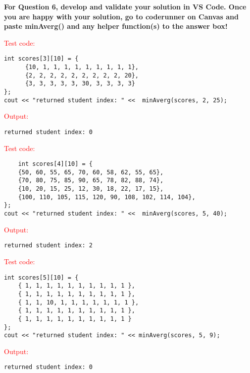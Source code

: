 \textbf{For Question 6, develop and validate your solution in VS Code. Once you are happy with your solution, go to coderunner on Canvas and paste minAverg() and any helper function(s) to the answer box!} 

\begin{sample}
\textcolor{red}{Test code:}
\begin{verbatim}
int scores[3][10] = {
      {10, 1, 1, 1, 1, 1, 1, 1, 1, 1},
      {2, 2, 2, 2, 2, 2, 2, 2, 2, 20},  
      {3, 3, 3, 3, 3, 30, 3, 3, 3, 3}
};
cout << "returned student index: " <<  minAverg(scores, 2, 25);
\end{verbatim}
\textcolor{red}{Output:}
\begin{verbatim}
returned student index: 0
\end{verbatim}
\end{sample}

\begin{sample}
\textcolor{red}{Test code:}
\begin{verbatim}
    int scores[4][10] = {
    {50, 60, 55, 65, 70, 60, 58, 62, 55, 65}, 
    {70, 80, 75, 85, 90, 65, 78, 82, 88, 74},
    {10, 20, 15, 25, 12, 30, 18, 22, 17, 15},  
    {100, 110, 105, 115, 120, 90, 108, 102, 114, 104},
};
cout << "returned student index: " <<  minAverg(scores, 5, 40);
\end{verbatim}
\textcolor{red}{Output:}
\begin{verbatim}
returned student index: 2
\end{verbatim}
\end{sample}

\begin{sample}
\textcolor{red}{Test code:}
\begin{verbatim}
int scores[5][10] = { 
    { 1, 1, 1, 1, 1, 1, 1, 1, 1, 1 },
    { 1, 1, 1, 1, 1, 1, 1, 1, 1, 1 },
    { 1, 1, 10, 1, 1, 1, 1, 1, 1, 1 },
    { 1, 1, 1, 1, 1, 1, 1, 1, 1, 1 },
    { 1, 1, 1, 1, 1, 1, 1, 1, 1, 1 }
};
cout << "returned student index: " << minAverg(scores, 5, 9);
\end{verbatim}
\textcolor{red}{Output:}
\begin{verbatim}
returned student index: 0
\end{verbatim}
\end{sample}














